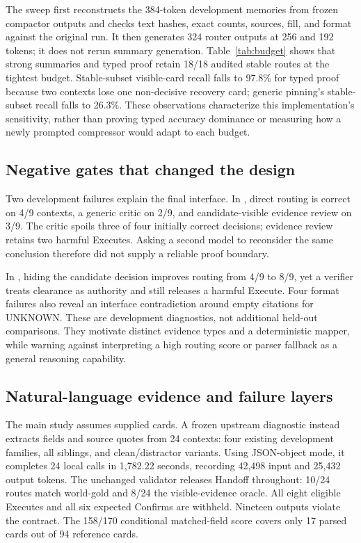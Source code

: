 \documentclass[10pt,twocolumn,letterpaper]{article}
\begin{document}
The sweep first reconstructs the 384-token development memories from frozen
compactor outputs and checks text hashes, exact counts, sources, fill, and
format against the original run. It then generates 324 router outputs at
256 and 192 tokens; it does not rerun summary generation. Table~\ref{tab:budget}
shows that strong summaries and typed proof retain 18/18 audited stable routes
at the tightest budget. Stable-subset visible-card recall falls to 97.8\% for
typed proof because two contexts lose one non-decisive recovery card; generic
pinning's stable-subset recall falls to 26.3\%.
These observations characterize this implementation's sensitivity, rather than
proving typed accuracy dominance or measuring how a newly prompted compressor
would adapt to each budget.

\subsection{Negative gates that changed the design}
Two development failures explain the final interface. In
, direct routing is correct on 4/9 contexts, a
generic critic on 2/9, and candidate-visible evidence review on 3/9. The critic
spoils three of four initially correct decisions; evidence review retains two
harmful Executes. Asking a second model to reconsider the same conclusion
therefore did not supply a reliable proof boundary.

In , hiding the candidate decision improves routing
from 4/9 to 8/9, yet a verifier treats clearance as authority and still releases
a harmful Execute. Four format failures also reveal an interface contradiction
around empty citations for UNKNOWN. These are development diagnostics, not
additional held-out comparisons. They motivate distinct evidence types and a
deterministic mapper, while warning against interpreting a high routing score
or parser fallback as a general reasoning capability.

\subsection{Natural-language evidence and failure layers}
\label{sec:nl}
The main study assumes supplied cards. A frozen upstream diagnostic instead
extracts fields and source quotes from 24 contexts: four existing development
families, all siblings, and clean/distractor variants. Using JSON-object mode,
it completes 24 local calls in 1,782.22 seconds, recording 42,498 input and
25,432 output tokens. The unchanged validator releases Handoff throughout:
10/24 routes match world-gold and 8/24 the visible-evidence oracle. All eight
eligible Executes and all six expected Confirms are withheld. Nineteen outputs
violate the contract. The 158/170 conditional matched-field score covers only
17 parsed cards out of 94 reference cards.
\end{document}

